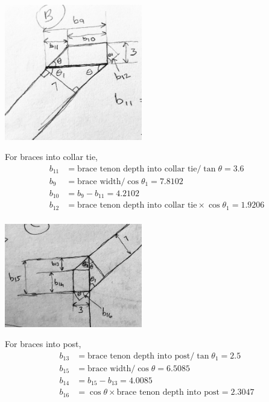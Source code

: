 \documentclass{article}\usepackage[]{graphicx}\usepackage[]{xcolor}
\begin{document}
\begin{center}
	\includegraphics[width=0.45\textwidth]{images/braces_into_ct}
\end{center}

For braces into collar tie, 
\begin{align*}
  b_{11} &= \text{brace tenon depth into collar tie}/\tan\theta = 3.6\\
  b_9 &= \text{brace width}/\cos\theta_1 = 7.8102\\
  b_{10} &= b_9 - b_{11} = 4.2102\\
  b_{12} &= \text{brace tenon depth into collar tie}\times \cos\theta_1 = 1.9206\\
\end{align*}

\begin{center}
	\includegraphics[width=0.45\textwidth]{images/braces_into_post}
\end{center}

For braces into post, 
\begin{align*}
  b_{13} &= \text{brace tenon depth into post}/\tan\theta_1 = 2.5\\
  b_{15} &= \text{brace width}/\cos\theta = 6.5085\\
  b_{14} &= b_{15} - b_{13} = 4.0085\\
  b_{16} &= \cos\theta\times \text{brace tenon depth into post} = 2.3047
\end{align*}
\end{document}
